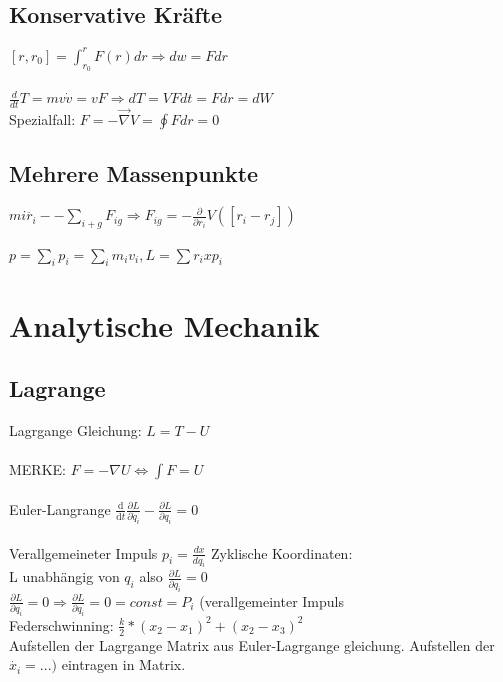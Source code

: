 \documentclass[10pt,a4paper]{article}
\begin{document}
\subsection{Konservative Kräfte}
$[r,r_0]=\int_{r_0}^r F(r) dr \Rightarrow dw = Fdr$\\
%
\\
$\frac{d}{dt}T=mv\dot{v}=vF \Rightarrow dT = VFdt = Fdr = dW$\\
Spezialfall: $F=-\vec{\nabla}V=\oint Fdr=0$\\

\subsection{Mehrere Massenpunkte}
$mi \ddot{r_i} -- \sum_{i+g} F_{ig} \Rightarrow F_{ig} = - \frac{\partial}{\partial r_i} V([r_i-r_j])$\\
%
\\
$p=\sum_i p_i = \sum_i m_i v_i, L = \sum r_i x p_i$\\







\section{Analytische Mechanik}
\subsection{Lagrange}
Lagrgange Gleichung: $L = T - U$\\
%
\\
MERKE: $F = -\nabla U \Leftrightarrow \int F = U$\\
%
\\
Euler-Langrange $\frac{\text{d}}{\text{d}t} \frac{\partial L}{\partial \dot{q}_i} - \frac{\partial{L}}{\partial q_i} = 0$\\
%
\\
Verallgemeineter Impuls
$p_i = \frac{d x}{d q_i}$
%
Zyklische Koordinaten:\\
L unabhängig von $q_i$ also $ \frac{\partial L}{\partial q_i}=0$\\
$\frac{\partial{L}}{\partial q_i}=0 \Rightarrow \frac{\partial L}{\partial q_i}=0=const=P_i$ (verallgemeinter Impuls\\
%
Federschwinning: $\frac{k}{2}*(x_2-x_1)^2+(x_2-x_3)^2$\\
%
Aufstellen der Lagrgange Matrix aus Euler-Lagrgange gleichung. Aufstellen der $\dot{x_i}=...)$  eintragen in Matrix.
\end{document}
